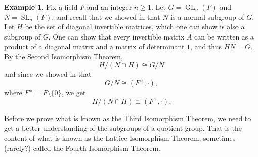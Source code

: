 \documentclass[12pt]{report}
\numberwithin{equation}{section}
\numberwithin{theorem}{chapter}
\theoremstyle{definition}
\newtheorem{example}[theorem]{Example}
\newtheorem*{basic properties}{Basic Properties}
\newtheorem*{Important Remark}{Important Remark}
\DeclareMathOperator{\GL}{GL}
\DeclareMathOperator{\SL}{SL}
\begin{document}
\begin{example} 
Fix a field $F$ and an integer $n \geqslant 1$. Let $G = \GL_n(F)$ and $N = \SL_n(F)$, and recall that we showed in  that $N$ is a normal subgroup of $G$. Let $H$ be the set of diagonal invertible matrices, which one can show is also a subgroup of $G$. One can show that every invertible matrix $A$ can be written as a product of a diagonal matrix and a matrix of determinant $1$, and thus $H N = G$. 
By the \hyperref[Second Isomorphism Theorem]{Second Isomorphism Theorem},
$$H/(N \cap H) \cong G/N$$
and since we showed in  that 
$$G/N \cong (F^\times, \cdot),$$ 
where $F^\times = F \setminus \{0\}$, we get
$$H/(N \cap H) \cong (F^\times, \cdot).$$

\end{example}




Before we prove what is known as the Third Isomorphism Theorem, we need to get a better understanding of the subgroups of a quotient group. That is the content of what is known as the Lattice Isomorphism Theorem, sometimes (rarely?) called the Fourth Isomorphism Theorem.
\end{document}
